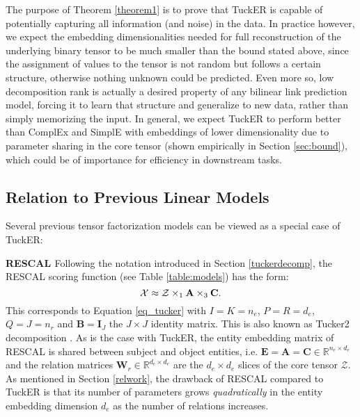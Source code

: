 \documentclass[11pt,a4paper]{article}
\newcommand{\keypoint}[1]{\vspace{0.1cm}\noindent\textbf{#1}\quad}
\begin{document}
The purpose of Theorem \ref{theorem1} is to prove that TuckER is capable of potentially capturing all information (and noise) in the data. In practice however, we expect the embedding dimensionalities needed for full reconstruction of the underlying binary tensor to be much smaller than the bound stated above, since the assignment of values to the tensor is not random but follows a certain structure, otherwise nothing unknown could be predicted. Even more so, low decomposition rank is actually a desired property of any bilinear link prediction model, forcing it to learn that structure and generalize to new data, rather than simply memorizing the input. In general, we expect TuckER to perform better than ComplEx and SimplE with embeddings of lower dimensionality due to parameter sharing in the core tensor (shown empirically in Section \ref{sec:bound}), which could be of importance for efficiency in downstream tasks. 


\subsection{Relation to Previous Linear Models}

Several previous tensor factorization models can be viewed as a special case of TuckER:

\keypoint{RESCAL \cite{nickel2011three}} Following the notation introduced in Section \ref{tuckerdecomp}, the RESCAL scoring function (see Table \ref{table:models}) has the form: 
\vspace{-0.2cm}
\begin{equation}
\mathcal{X} \approx \mathcal{Z} \times_1 \mathbf{A} \times_3 \mathbf{C}.
\label{eq_tucker2}
\vspace{-0.2cm}
\end{equation}
This corresponds to Equation \ref{eq_tucker} with $I = K = n_e$, $P = R = d_e$, $Q = J = n_r$ and $\mathbf{B} = \mathbf{I}_J$ the $J \times J$ identity matrix. This is also known as Tucker2 decomposition \cite{kolda2009tensor}. As is the case with TuckER, the entity embedding matrix of RESCAL is shared between subject and object entities, i.e. $\mathbf{E} = \mathbf{A} = \mathbf{C} \in \mathbb{R}^{n_e \times d_e}$ and the relation matrices $\mathbf{W}_r \in \mathbb{R}^{d_e \times d_e}$ are the $d_e \times d_e$ slices of the core tensor $\mathcal{Z}$. As mentioned in Section \ref{relwork}, the drawback of RESCAL compared to TuckER is that its number of parameters grows \emph{quadratically} in the entity embedding dimension $d_e$ as the number of relations increases. 
\end{document}
